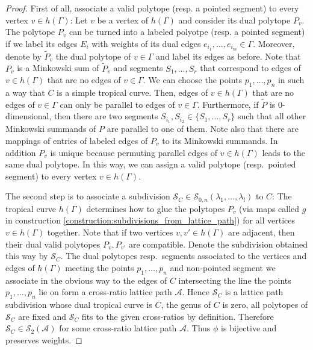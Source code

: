 \documentclass[11pt,reqno,a4]{amsart}
\theoremstyle{dotless}
\theoremstyle{definition}
\begin{document}
\begin{proof}
First of all, associate a valid polytope (resp. a pointed segment) to every vertex $v\in h(\Gamma)$: Let $v$ be a vertex of $h(\Gamma)$ and consider its dual polytope $P_v$. The polytope $P_v$ can be turned into a labeled polyotpe (resp. a pointed segment) if we label its edges $E_i$ with weights of its dual edges $e_{i_1},\dots,e_{i_m}\in \Gamma$. Moreover, denote by $\tilde{P}_v$ the dual polytope of $v\in \Gamma$ and label its edges as before. Note that $P_v$ is a Minkowski sum of $\tilde{P}_v$ and segments $S_1,\dots, S_r$ that correspond to edges of $v\in h(\Gamma)$ that are no edges of $v\in \Gamma$. We can choose the points $p_1,\dots,p_n$ in such a way that $C$ is a simple tropical curve. Then, edges of $v\in h(\Gamma)$ that are no edges of $v\in \Gamma$ can only be parallel to edges of $v\in \Gamma$. Furthermore, if $\tilde{P}$ is $0$-dimensional, then there are two segments $S_{i_1},S_{i_2}\in\lbrace S_1,\dots, S_r\rbrace$ such that all other Minkowski summands of $P$ are parallel to one of them. Note also that there are mappings of entries of labeled edges of $P_v$ to its Minkowski summands. In addition $P_v$ is unique because permuting parallel edges of $v\in h(\Gamma)$ leads to the same dual polytope. In this way, we can assign a valid polytope (resp.\ pointed segment) to every vertex $v\in h(\Gamma)$.

The second step is to associate a subdivision $\mathcal{S}_C\in \mathcal{S}_{0,n}\left( \lambda_1,\dots,\lambda_l\right)$ to $C$: The tropical curve $h(\Gamma)$ determines how to glue the polytopes $P_v$ (via maps called $g$ in construction \ref{construction:subdivisions_from_lattice_path}) for all vertices $v\in h(\Gamma)$ together. Note that if two vertices $v,v'\in h(\Gamma)$ are adjacent, then their dual valid polytopes $P_v,P_{v'}$ are compatible. Denote the subdivision obtained this way by $\mathcal{S}_C$. The dual polytopes resp.\ segments associated to the vertices and edges of $h(\Gamma)$  meeting the points $p_1,\dots,p_n$ and non-pointed segment we associate in the obvious way to the edges of $C$ intersecting the line the points $p_1,\dots,p_n$ lie on form a cross-ratio lattice path $\mathcal{A}$. Hence $\mathcal{S}_C$ is a lattice path subdivision whose dual tropical curve is $C$, the genus of $C$ is zero, all polytopes of $\mathcal{S}_C$ are fixed and $\mathcal{S}_C$ fits to the given cross-ratios by definition. Therefore $\mathcal{S}_C\in\mathcal{S}_2(\mathcal{A})$ for some cross-ratio lattice path $\mathcal{A}$.
Thus $\phi$ is bijective and preserves weights.
\end{proof}
\end{document}
